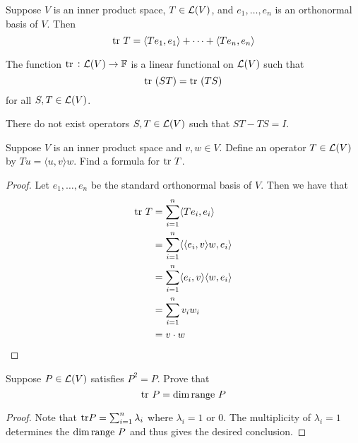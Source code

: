 \documentclass{extarticle}
\begin{document}
\begin{corollary}
    Suppose \(V\) is an inner product space, \(T \in \mathcal{L}(V)\), and \(e_1, \ldots, e_n\) is an orthonormal 
    basis of \(V\). Then 
    \[\text{tr} \ T = \langle Te_1,e_1 \rangle + \cdots + \langle Te_n,e_n \rangle\]
\end{corollary}

\begin{thm}
    The function \(\text{tr} \ \colon \mathcal{L}(V) \to \mathbb{F}\) is a linear functional on \(\mathcal{L}(V)\) such that 
    \[\text{tr} \ (ST) = \text{tr} \ (TS)\]
    for all \(S, T \in \mathcal{L}(V)\).
\end{thm}


\begin{corollary}
    There do not exist operators \(S, T \in \mathcal{L}(V)\) such that \(ST - TS = I\).
\end{corollary}



\newpage 
{}

\begin{problem}{1}
    Suppose \(V\) is an inner product space and \(v, w \in V\). Define an operator \(T \in \mathcal{L}(V)\)
    by \(Tu = \langle u,v \rangle w\). Find a formula for \(\text{tr} \ T\).
\end{problem}

\begin{proof}
Let \(e_1, \ldots, e_n\) be the standard orthonormal basis of \(V\). Then we have that 
\begin{align*}
    \text{tr} \ T 
    &= \sum_{i=1}^{n} \langle T e_i, e_i \rangle \\ 
    &= \sum_{i=1}^{n} \langle \langle e_i,v \rangle w, e_i \rangle \\ 
    &= \sum_{i=1}^{n} \langle e_i,v \rangle \langle w,e_i \rangle \\ 
    &= \sum_{i=1}^{n} v_i w_i \\ 
    &=  v \cdot w
\end{align*}
\end{proof}


\begin{problem}{2}
    Suppose \(P \in \mathcal{L}(V)\) satisfies \(P^2 = P\). Prove that 
    \[\text{tr} \ P = \dim \text{range } P\]
\end{problem}

\begin{proof}
Note that \(\text{tr} P = \sum_{i=1}^{n} \lambda_i\) where \(\lambda_i = 1 \) or \(0\). The multiplicity of 
\(\lambda_i = 1\) determines the \(\dim \text{range } P\) and thus gives the desired conclusion.  
\end{proof}
\end{document}
